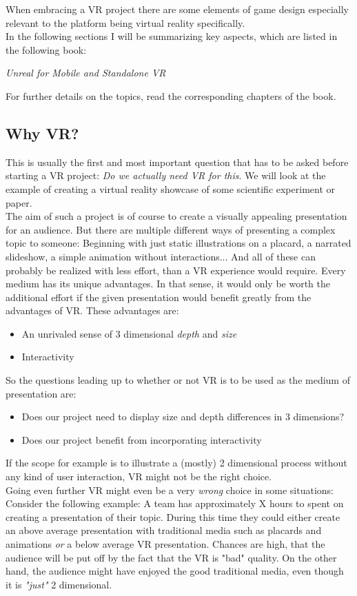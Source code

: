 When embracing a VR project there are some elements of game design especially relevant to the platform being virtual reality specifically.\\
In the following sections I will be summarizing key aspects, which are listed in the following book:

\textit{Unreal for Mobile and Standalone VR}\cite{MobileVR}

For further details on the topics, read the corresponding chapters of the book.

\subsection{Why VR?}

This is usually the first and most important question that has to be asked before starting a VR project: \textit{Do we actually need VR for this}. We will look at the example of creating a virtual reality showcase of some scientific experiment or paper.\\ 
The aim of such a project is of course to create a visually appealing presentation for an audience. But there are multiple different ways of presenting a complex topic to someone: Beginning with just static illustrations on a placard, a narrated slideshow, a simple animation without interactions... And all of these can probably be realized with less effort, than a VR experience would require. Every medium has its unique advantages. In that sense, it would only be worth the additional effort if the given presentation would benefit greatly from the advantages of VR. These advantages are:

\begin{itemize}
\item An unrivaled sense of 3 dimensional \textit{depth} and \textit{size}
\item Interactivity
\end{itemize}

So the questions leading up to whether or not VR is to be used as the medium of presentation are:

\begin{itemize}
\item Does our project need to display size and depth differences in 3 dimensions?
\item Does our project benefit from incorporating interactivity
\end{itemize}

If the scope for example is to illustrate a (mostly) 2 dimensional process without any kind of user interaction, VR might not be the right choice.\\
Going even further VR might even be a very \textit{wrong} choice in some situations: Consider the following example: A team has approximately X hours to spent on creating a presentation of their topic. During this time they could either create an above average presentation with traditional media such as placards and animations \textit{or} a below average VR presentation. Chances are high, that the audience will be put off by the fact that the VR is "bad" quality. On the other hand, the audience might have enjoyed the good traditional media, even though it is \textit{"just"} 2 dimensional.

